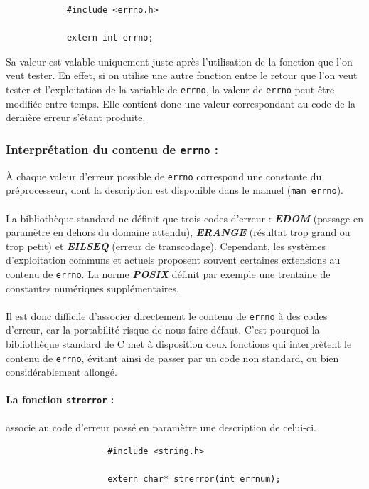 		\begin{lstlisting}
			#include <errno.h>

			extern int errno;
		\end{lstlisting}
		
		Sa valeur est valable uniquement juste après l'utilisation de la fonction que l'on veut tester. En effet, si on utilise une autre fonction entre le retour que l'on veut tester et l'exploitation de la variable de \lstinline!errno!, la valeur de \lstinline!errno! peut être modifiée entre temps. Elle contient donc une valeur correspondant au code de la dernière erreur s'étant produite.
		
		\subsubsection*{Interprétation du contenu de \lstinline!errno! :}
			À chaque valeur d'erreur possible de \lstinline!errno! correspond une constante du préprocesseur, dont la description est disponible dans le manuel (\lstinline!man errno!).
			
			\paragraph{} La bibliothèque standard ne définit que trois codes d'erreur : \textbf{\textit{EDOM}} (passage en paramètre en dehors du domaine attendu), \textbf{\textit{ERANGE}} (résultat trop grand ou trop petit) et \textbf{\textit{EILSEQ}} (erreur de transcodage). Cependant, les systèmes d'exploitation communs et actuels proposent souvent certaines extensions au contenu de \lstinline!errno!. La norme \textbf{\textit{POSIX}} définit par exemple une trentaine de constantes numériques supplémentaires.
			
			\paragraph{} Il est donc difficile d'associer directement le contenu de \lstinline!errno! à des codes d'erreur, car la portabilité risque de nous faire défaut. C'est pourquoi la bibliothèque standard de C met à disposition deux fonctions qui interprètent le contenu de \lstinline!errno!, évitant ainsi de passer par un code non standard, ou bien considérablement allongé.
			
			\paragraph{La fonction \lstinline!strerror! :} associe au code d'erreur passé en paramètre une description de celui-ci.
				\begin{lstlisting}
					#include <string.h>
					
					extern char* strerror(int errnum);
				\end{lstlisting}
			
